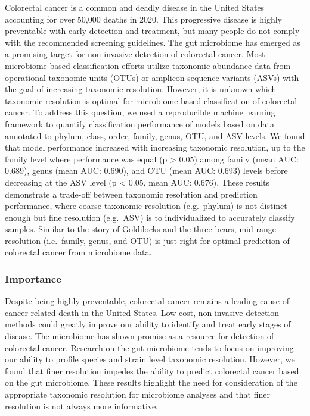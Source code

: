 \documentclass[
]{article}
\begin{document}
Colorectal cancer is a common and deadly disease in the United States
accounting for over 50,000 deaths in 2020. This progressive disease is
highly preventable with early detection and treatment, but many people
do not comply with the recommended screening guidelines. The gut
microbiome has emerged as a promising target for non-invasive detection
of colorectal cancer. Most microbiome-based classification efforts
utilize taxonomic abundance data from operational taxonomic units (OTUs)
or amplicon sequence variants (ASVs) with the goal of increasing
taxonomic resolution. However, it is unknown which taxonomic resolution
is optimal for microbiome-based classification of colorectal cancer. To
address this question, we used a reproducible machine learning framework
to quantify classification performance of models based on data annotated
to phylum, class, order, family, genus, OTU, and ASV levels. We found
that model performance increased with increasing taxonomic resolution,
up to the family level where performance was equal (p \textgreater{}
0.05) among family (mean AUC: 0.689), genus (mean AUC: 0.690), and OTU
(mean AUC: 0.693) levels before decreasing at the ASV level (p
\textless{} 0.05, mean AUC: 0.676). These results demonstrate a
trade-off between taxonomic resolution and prediction performance, where
coarse taxonomic resolution (e.g.~phylum) is not distinct enough but
fine resolution (e.g.~ASV) is to individualized to accurately classify
samples. Similar to the story of Goldilocks and the three bears,
mid-range resolution (i.e.~family, genus, and OTU) is just right for
optimal prediction of colorectal cancer from microbiome data.

\hypertarget{importance}{%
\subsubsection{Importance}\label{importance}}

Despite being highly preventable, colorectal cancer remains a leading
cause of cancer related death in the United States. Low-cost,
non-invasive detection methods could greatly improve our ability to
identify and treat early stages of disease. The microbiome has shown
promise as a resource for detection of colorectal cancer. Research on
the gut microbiome tends to focus on improving our ability to profile
species and strain level taxonomic resolution. However, we found that
finer resolution impedes the ability to predict colorectal cancer based
on the gut microbiome. These results highlight the need for
consideration of the appropriate taxonomic resolution for microbiome
analyses and that finer resolution is not always more informative.
\end{document}
